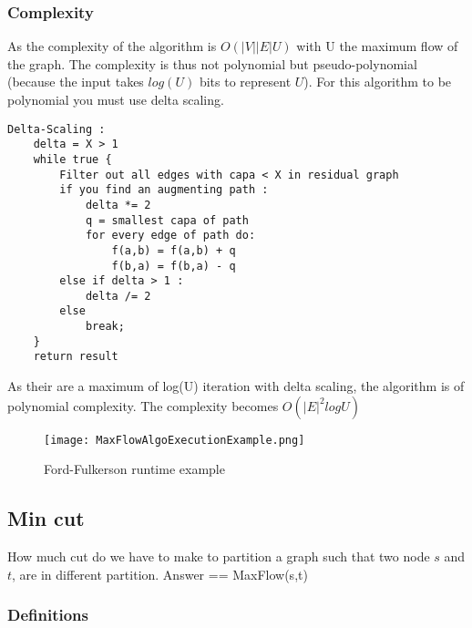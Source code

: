 \subsubsection{Complexity}
As the complexity of the algorithm is $O(|V| |E| U)$ with U the
maximum flow of the graph. The complexity is thus not polynomial but
pseudo-polynomial (because the input takes $log(U)$ bits to represent
$U$). For this algorithm to be polynomial you must use
delta scaling.

\begin{lstlisting}
Delta-Scaling :
    delta = X > 1
    while true {
        Filter out all edges with capa < X in residual graph
        if you find an augmenting path :
            delta *= 2
            q = smallest capa of path
            for every edge of path do:
                f(a,b) = f(a,b) + q
                f(b,a) = f(b,a) - q
        else if delta > 1 :
            delta /= 2
        else
            break;
    }
    return result
\end{lstlisting}


As their are a maximum of log(U) iteration with delta scaling, the
algorithm is of polynomial complexity. The complexity becomes 
$O(|E|^2 log U)$

\begin{figure}[!ht]
    \centering
    \texttt{[image: MaxFlowAlgoExecutionExample.png]}
    \caption{Ford-Fulkerson runtime example}
    \label{fig:Ford-Fulkerson_example}
\end{figure}


\subsection{Min cut}

How much cut do we have to make to partition a graph such that two node
$s$ and $t$, are in different partition. Answer == MaxFlow(s,t)

\subsubsection{Definitions}


